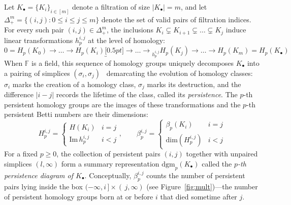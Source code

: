Let $K_\bullet = \{K_i\}_{i\in [m]}$ denote a filtration of size $\lvert K_\bullet \rvert = m$, 
and let $\Delta_{+}^m = \{ (i,j) : 0 \leq i \leq j \leq m \}$ denote the set of valid pairs of filtration indices. 
For every such pair $(i,j) \in \Delta_{+}^m$, the inclusions $K_i \subsetneq K_{i+1} \subsetneq \dots \subsetneq K_j$ induce linear transformations $h_p^{i,j}$  at the level of homology:
\begin{equation}\label{eq:hom_map}
	0 = H_p(K_0) \to \dots \to H_p(K_i) \underbracket[0.5pt]{\to \dots \to}_{h_p^{i,j}} H_p(K_j) \to \dots \to H_p(K_m) = H_p(K_\bullet) 
\end{equation}
When $\mathbb{F}$ is a field, this sequence of homology groups uniquely decomposes $K_\bullet$ into a pairing of simplices $(\sigma_i, \sigma_j)$~\cite{zomorodian2004computing} demarcating the evolution of homology classes: $\sigma_i$ marks the creation of a homology class, $\sigma_j$ marks its destruction, and the difference $\lvert i - j \rvert$ records the lifetime of the class, called its \emph{persistence}.
The $p$-th persistent homology groups are the images of these transformations and the $p$-th persistent Betti numbers are their dimensions:
\begin{equation}
	H_{p}^{i,j} = \begin{cases}
	H(K_i) & i = j \\ 
 	\mathrm{Im}\,h_p^{i,j} & i < j
 \end{cases}
, \quad \quad 
\beta_p^{i,j} = \begin{cases}
 	\beta_p(K_i) & i = j \\
 	\mathrm{dim}(H_{p}^{i,j}) & i < j
 \end{cases}
\end{equation}
For a fixed $p \geq 0$, the collection of persistent pairs $(i, j)$ together with unpaired simplices $(l, \infty)$ form a summary representation $\mathrm{dgm}_p(K_\bullet)$ called the \emph{$p$-th persistence diagram of $K_\bullet$}. Conceptually, $\beta_p^{i,j}$ counts the number of persistent pairs lying inside the box $(-\infty, i\,] \times (\,j, \infty)$ (see Figure~\ref{fig:mult})---the number of persistent homology groups born at or before $i$ that died sometime after $j$. 





